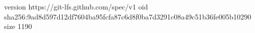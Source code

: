 version https://git-lfs.github.com/spec/v1
oid sha256:9ad8d597d12df7604ba95fcfa87c6d8f0ba7d3291c08a49c51b36fe005b10290
size 1190
